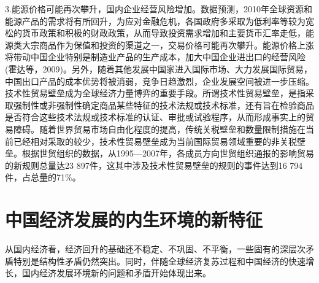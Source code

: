 3.能源价格可能再次攀升，国内企业经营风险增加。数据预测，2010年全球资源和能源产品的需求将有所回升，为应对金融危机，各国政府多采取为低利率等较为宽松的货币政策和积极的财政政策，从而导致投资需求增加和主要货币汇率走低，能源类大宗商品作为保值和投资的渠道之一，交易价格可能再次攀升。能源价格上涨将带动中国企业特别是制造业产品的生产成本，加大中国企业进出口的经营风险(霍达等，2009)。另外，随着其他发展中国家进入国际市场、大力发展国际贸易，中国出口产品的成本优势将被消弱，竞争日趋激烈，企业发展空间被进一步压缩。 技术性贸易壁垒成为全球经济力量博弈的重要手段。所谓技术性贸易壁垒，是指采取强制性或非强制性确定商品某些特征的技术法规或技术标准，还有旨在检验商品是否符合这些技术法规或技术标准的认证、审批或试验程序，从而形成事实上的贸易障碍。随着世界贸易市场自由化程度的提高，传统关税壁垒和数量限制措施在当前已经相对采取的较少，技术性贸易壁垒成为当前国际贸易领域重要的非关税壁垒。根据世贸组织的数据，从1995—2007年，各成员方向世贸组织通报的影响贸易的新规则总量达23 897件，这其中涉及技术性贸易壁垒的规则的事件达到16 794件，占总量的71$\%$。
 
\section{中国经济发展的内生环境的新特征}

从国内经济看，经济回升的基础还不稳定、不巩固、不平衡，一些固有的深层次矛盾特别是结构性矛盾仍然突出。同时，伴随全球经济复苏过程和中国经济的快速增长，国内经济发展环境新的问题和矛盾开始体现出来。

